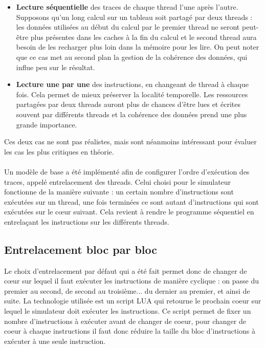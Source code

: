 \begin{itemize}
  \item \textbf{Lecture séquentielle} des traces de chaque thread l'une après l'autre. Supposons qu'un long calcul sur un tableau soit partagé par deux threads : les données utilisées au début du calcul par le premier thread ne seront peut-être plus présentes dans les caches à la fin du calcul et le second thread aura besoin de les recharger plus loin dans la mémoire pour les lire. On peut noter que ce cas met au second plan la gestion de la cohérence des données, qui influe peu sur le résultat.
  \item \textbf{Lecture une par une} des instructions, en changeant de thread à chaque fois. Cela permet de mieux préserver la localité temporelle. Les ressources partagées par deux threads auront plus de chances d'être lues et écrites souvent par différents threads et la cohérence des données prend une plus grande importance.
\end{itemize} 

Ces deux cas ne sont pas réalistes, mais sont néanmoins intéressant pour évaluer les cas les plus critiques en théorie.

\paragraph{}
Un modèle de base a été implémenté afin de configurer l'ordre d'exécution des traces, appelé entrelacement des threads. Celui choisi pour le simulateur fonctionne de la manière suivante : un certain nombre d'instructions sont exécutées sur un thread, une fois terminées ce sont autant d'instructions qui sont exécutées sur le c\oe ur suivant. Cela revient à rendre le programme  séquentiel en entrelaçant les instructions sur les différents threads.

\subsection{Entrelacement bloc par bloc}

Le choix d'entrelacement par défaut qui a été fait permet donc de changer de c\oe ur sur lequel il faut exécuter les instructions de manière cyclique : on passe du premier au second, de second au troisième... du dernier au premier, et ainsi de suite. La technologie utilisée est un script LUA qui retourne le prochain coeur sur lequel le simulateur doit exécuter les instructions. Ce script permet de fixer un nombre d'instructions à exécuter avant de changer de coeur, pour changer de coeur à chaque instructions il faut donc réduire la taille du bloc d'instructions à exécuter à une seule instruction.\\

